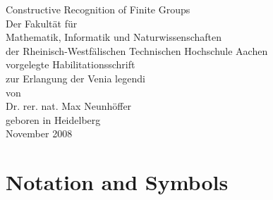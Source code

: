 \documentclass[openany,11pt,british]{book}
\theoremstyle{changebreak}
\begin{document}
\thispagestyle{empty}
\begin{center}
    {\Huge Constructive Recognition of Finite Groups}\\[3cm]
\large
Der Fakult\"at f\"ur\\[5mm]
Mathematik, Informatik und Naturwissenschaften\\[5mm]
der Rheinisch-Westf\"alischen Technischen Hochschule Aachen\\[5mm]
vorgelegte Habilitationsschrift\\[5mm]
zur Erlangung der Venia legendi\\[4cm]
von\\[5mm]
Dr. rer. nat. Max Neunh\"offer\\[5mm]
geboren in Heidelberg\\[4cm]
November 2008
\end{center}
\newpage




\newpage\enlargethispage{-2\baselineskip}
\tableofcontents
\thispagestyle{fancy}





%




%

\appendix

%

\thispagestyle{fancy}

\chapter{Notation and Symbols}
\end{document}
